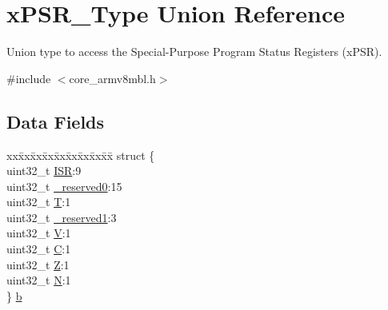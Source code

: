 \hypertarget{unionx_p_s_r___type}{}\section{x\+P\+S\+R\+\_\+\+Type Union Reference}
\label{unionx_p_s_r___type}


Union type to access the Special-\/\+Purpose Program Status Registers (x\+P\+SR).  




{\ttfamily \#include $<$core\+\_\+armv8mbl.\+h$>$}

\subsection*{Data Fields}
\begin{DoxyCompactItemize}
\item 
\begin{tabbing}
xx\=xx\=xx\=xx\=xx\=xx\=xx\=xx\=xx\=\kill
struct \{\\
\>uint32\_t \mbox{\hyperlink{unionx_p_s_r___type_ad502ba7dbb2aab5f87c782b28f02622d}{ISR}}:9\\
\>uint32\_t \mbox{\hyperlink{unionx_p_s_r___type_ac8a6a13838a897c8d0b8bc991bbaf7c1}{\_reserved0}}:15\\
\>uint32\_t \mbox{\hyperlink{unionx_p_s_r___type_a6e1cf12e53a20224f6f62c001d9be972}{T}}:1\\
\>uint32\_t \mbox{\hyperlink{unionx_p_s_r___type_a959a73d8faee56599b7e792a7c5a2d16}{\_reserved1}}:3\\
\>uint32\_t \mbox{\hyperlink{unionx_p_s_r___type_acd4a2b64faee91e4a9eef300667fa222}{V}}:1\\
\>uint32\_t \mbox{\hyperlink{unionx_p_s_r___type_a7a1caf92f32fe9ebd8d1fe89b06c7776}{C}}:1\\
\>uint32\_t \mbox{\hyperlink{unionx_p_s_r___type_a5ae954cbd9986cd64625d7fa00943c8e}{Z}}:1\\
\>uint32\_t \mbox{\hyperlink{unionx_p_s_r___type_abae0610bc2a97bbf7f689e953e0b451f}{N}}:1\\
\} \mbox{\hyperlink{unionx_p_s_r___type_ab8c7e447f1066269ed114d5da6ad0618}{b}}\\


\end{tabbing}
\end{DoxyCompactItemize}
